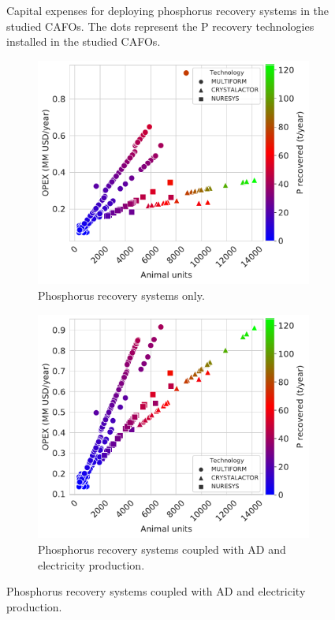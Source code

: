 \begin{refsection}[referencesCh4]
\begin{figure}[h]
	\caption{Capital expenses for deploying phosphorus recovery systems in the studied CAFOs. The dots represent the P recovery technologies installed in the studied CAFOs.}
	\label{fig:Capital_TechSelected}
\end{figure}


\begin{figure}[h]
	\begin{subfigure}[t]{0.48\linewidth}
		\includegraphics[width=\linewidth]{gfx/Chapter4/Amortized_TechSelected_Pcredits22_REC0.pdf} 
		\caption{Phosphorus recovery systems only.}
		\label{fig:OPEX_TechSelected_Pcredits22_REC0}
	\end{subfigure}
	\quad
	\begin{subfigure}[t]{0.48\linewidth}
		\includegraphics[width=\linewidth]{gfx/Chapter4/Amortized_TechSelected_Pcredits22_REC60.pdf}
		\caption{Phosphorus recovery systems coupled with AD and electricity production.}
		\label{fig:OPEX_TechSelected_Pcredits22_REC60}
	\end{subfigure}
	

\end{figure}
\end{refsection}
